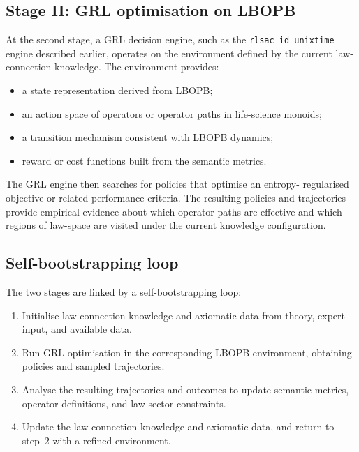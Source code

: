 \documentclass[11pt]{book}
\theoremstyle{plain}
\theoremstyle{definition}
\theoremstyle{remark}
\begin{document}
\subsection*{Stage II: GRL optimisation on LBOPB}

At the second stage, a GRL decision engine, such as the
\texttt{rlsac\_id\_unixtime} engine described earlier, operates on the
environment defined by the current law-connection knowledge. The
environment provides:

\begin{itemize}
  \item a state representation derived from LBOPB;
  \item an action space of operators or operator paths in life-science
        monoids;
  \item a transition mechanism consistent with LBOPB dynamics;
  \item reward or cost functions built from the semantic metrics.
\end{itemize}

The GRL engine then searches for policies that optimise an entropy-
regularised objective or related performance criteria. The resulting
policies and trajectories provide empirical evidence about which
operator paths are effective and which regions of law-space are
visited under the current knowledge configuration.

\subsection*{Self-bootstrapping loop}

The two stages are linked by a self-bootstrapping loop:

\begin{enumerate}
  \item Initialise law-connection knowledge and axiomatic data from
        theory, expert input, and available data.
  \item Run GRL optimisation in the corresponding LBOPB environment,
        obtaining policies and sampled trajectories.
  \item Analyse the resulting trajectories and outcomes to update
        semantic metrics, operator definitions, and law-sector
        constraints.
  \item Update the law-connection knowledge and axiomatic data, and
        return to step~2 with a refined environment.
\end{enumerate}
\end{document}
